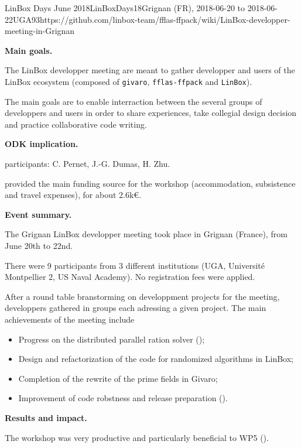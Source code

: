 \begin{event}{LinBox Days June 2018}{LinBoxDays18}{Grignan (FR),
2018-06-20 to 2018-06-22}{UGA}{9}{3}{https://github.com/linbox-team/fflas-ffpack/wiki/LinBox-developper-meeting-in-Grignan}

\textbf{Main goals.}

The LinBox developper meeting are meant to gather developper and users of the
LinBox ecosystem (composed of \texttt{givaro}, \texttt{fflas-ffpack} and
\texttt{LinBox}).

The main goals are to enable interraction between the several groups of
developpers and users in order to share experiences, take collegial design
decision and practice collaborative code writing.

\textbf{ODK implication.} 

\ODK participants: C. Pernet, J.-G. Dumas, H. Zhu.

\ODK provided the main funding source for the workshop (accommodation,
subsistence and travel expenses), for about 2.6k\euro.

\textbf{Event summary.} 

The Grignan LinBox developper meeting took place in Grignan (France), from June
20th to 22nd.

There were 9 participants from 3 different institutions (UGA, Université
Montpellier 2, US Naval Academy).
No registration fees were applied.

After a round table branstorming on developpment projects for the meeting,
developpers gathered in groups each adressing a given project.
The main achievements of the meeting include
\begin{itemize}
\item Progress on the distributed parallel ration solver ();
\item Design and refactorization of the code for randomized algorithms in LinBox;
\item Completion of the rewrite of the prime fields in Givaro;
\item Improvement of code robstness and release preparation ().
\end{itemize}


\textbf{Results and impact.} 

The workshop was very productive and particularly beneficial to WP5 ().
\end{event}
